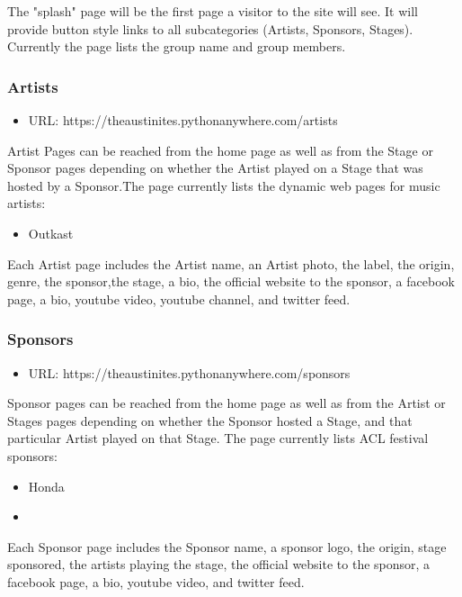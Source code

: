 \documentclass[12pt,english]{scrartcl}
\begin{document}
The "splash" page will be the first page a visitor to the site will see. It will provide button style links to all subcategories (Artists,
Sponsors, Stages). Currently the page lists the group name and group members.

\subsubsection{Artists}

\begin{itemize}
 \item URL: https://theaustinites.pythonanywhere.com/artists
\end{itemize}

Artist Pages can be reached from the home page as well as from the Stage or Sponsor pages depending on whether the Artist played on
a Stage that was hosted by a Sponsor.The page currently lists the dynamic web pages for music artists:
\begin{itemize}
 \item Outkast
\end{itemize}

Each Artist page includes the Artist name, an Artist photo, the label, the origin, genre, the sponsor,the stage, a bio,
the official website to the sponsor, a facebook page, a bio, youtube video, youtube channel, and twitter feed.

\subsubsection{Sponsors}

\begin{itemize}
 \item URL: https://theaustinites.pythonanywhere.com/sponsors
\end{itemize}

Sponsor pages can be reached from the home page as well as from the Artist or Stages pages depending on whether the Sponsor hosted a
Stage, and that particular Artist played on that Stage. The page currently lists ACL festival sponsors:
\begin{itemize}
 \item Honda
\end{itemize}
\begin{itemize}
 \item 
\end{itemize}


Each Sponsor page includes the Sponsor name, a sponsor logo, the origin, stage sponsored, the artists playing the stage, the official website to the sponsor,
a facebook page, a bio, youtube video, and twitter feed.
\end{document}
